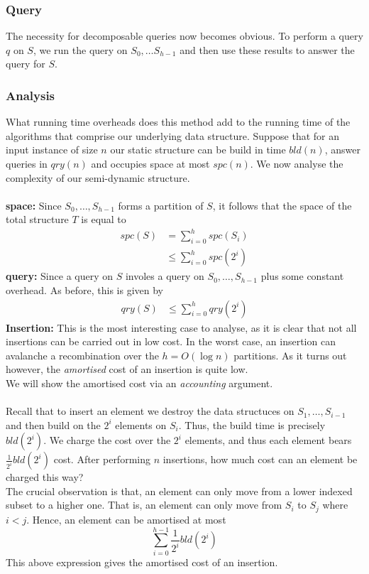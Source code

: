 \documentclass{article}
\begin{document}
\subsubsection*{Query}

The necessity for decomposable queries now becomes obvious. To perform a query $q$ on $S$, we run the query on $S_0, \dots S_{h-1}$ and then use these results to answer the query for $S$.

\subsubsection*{Analysis}

What running time overheads does this method add to the running time of the algorithms that comprise our underlying data structure. Suppose that for an input instance of size $n$ our static structure can be build in time $bld(n)$, answer queries in $qry(n)$ and occupies space at most $spc(n)$. We now analyse the complexity of our semi-dynamic structure. \\
\\
\textbf{space:} Since $S_0,\dots,S_{h-1}$ forms a partition of $S$, it follows that the space of the total structure $T$ is equal to 
\begin{align*}
    spc(S) &= \sum_{i=0}^{h} spc(S_i) \\
    &\leq \sum_{i=0}^{h} spc(2^i)
\end{align*}
\textbf{query:} Since a query on $S$ involes a query on $S_0, \dots, S_{h-1}$ plus some constant overhead. As before, this is given by 
\begin{align*}
    qry(S) &\leq \sum_{i=0}^{h}qry(2^i) 
\end{align*}
\textbf{Insertion:} This is the most interesting case to analyse, as it is clear that not all insertions can be carried out in low cost. In the worst case, an insertion can avalanche a recombination over the $h = O(\log n)$ partitions. As it turns out however, the \textit{amortised} cost of an insertion is quite low. \\
We will show the amortised cost via an \textit{accounting} argument. \\
\\
Recall that to insert an element we destroy the data structuces on $S_1, \dots,S_{i-1}$ and then build on the $2^i$ elements on $S_i$. Thus, the build time is precisely $bld(2^i)$. We charge the cost over the $2^i$ elements, and thus each element bears $\frac{1}{2^i}bld(2^i)$ cost. After performing $n$ insertions, how much cost can an element be charged this way? \\
The crucial observation is that, an element can only move from a lower indexed subset to a higher one. That is, an element can only move from $S_i$ to $S_j$ where $i < j$. Hence, an element can be amortised at most
$$\sum_{i=0}^{h-1} \frac{1}{2^i}bld(2^i)$$
This above expression gives the amortised cost of an insertion.
\end{document}
